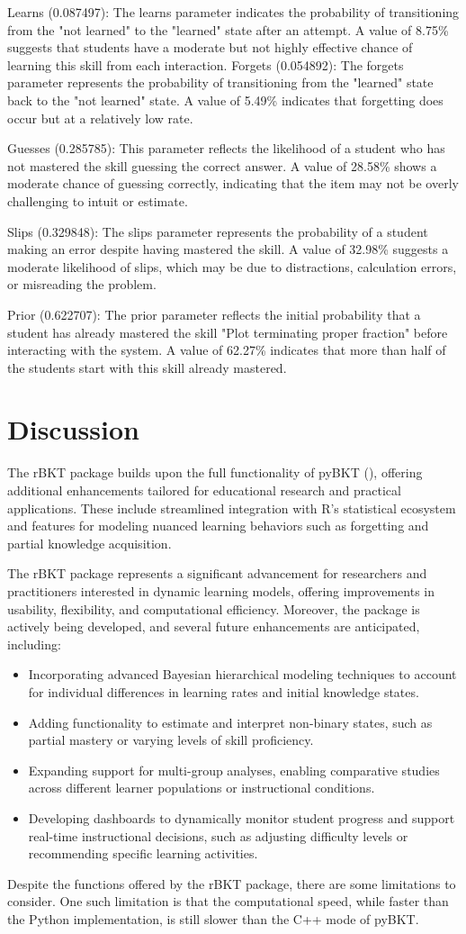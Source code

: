 \documentclass{article}
\begin{document}
Learns (0.087497): The learns parameter indicates the probability of transitioning from the "not learned" to the "learned" state after an attempt. A value of 8.75\% suggests that students have a moderate but not highly effective chance of learning this skill from each interaction.
Forgets (0.054892): The forgets parameter represents the probability of transitioning from the "learned" state back to the "not learned" state. A value of 5.49\% indicates that forgetting does occur but at a relatively low rate.

Guesses (0.285785): This parameter reflects the likelihood of a student who has not mastered the skill guessing the correct answer. A value of 28.58\% shows a moderate chance of guessing correctly, indicating that the item may not be overly challenging to intuit or estimate.

Slips (0.329848): The slips parameter represents the probability of a student making an error despite having mastered the skill. A value of 32.98\% suggests a moderate likelihood of slips, which may be due to distractions, calculation errors, or misreading the problem.

Prior (0.622707): The prior parameter reflects the initial probability that a student has already mastered the skill "Plot terminating proper fraction" before interacting with the system. A value of 62.27\% indicates that more than half of the students start with this skill already mastered.

\section{Discussion}
The rBKT package builds upon the full functionality of pyBKT (\cite{psych5030050}), offering additional enhancements tailored for educational research and practical applications. These include streamlined integration with R's statistical ecosystem and features for modeling nuanced learning behaviors such as forgetting and partial knowledge acquisition.

The rBKT package represents a significant advancement for researchers and practitioners interested in dynamic learning models, offering improvements in usability, flexibility, and computational efficiency. Moreover, the package is actively being developed, and several future enhancements are anticipated, including:

\begin{itemize}
\item Incorporating advanced Bayesian hierarchical modeling techniques to account for individual differences in learning rates and initial knowledge states.
\item Adding functionality to estimate and interpret non-binary states, such as partial mastery or varying levels of skill proficiency.
\item Expanding support for multi-group analyses, enabling comparative studies across different learner populations or instructional conditions.
\item Developing dashboards to dynamically monitor student progress and support real-time instructional decisions, such as adjusting difficulty levels or recommending specific learning activities.
\end{itemize}

Despite the functions offered by the rBKT package, there are some limitations to consider. One such limitation is that the computational speed, while faster than the Python implementation, is still slower than the C++ mode of pyBKT. 

\printbibliography
\end{document}
